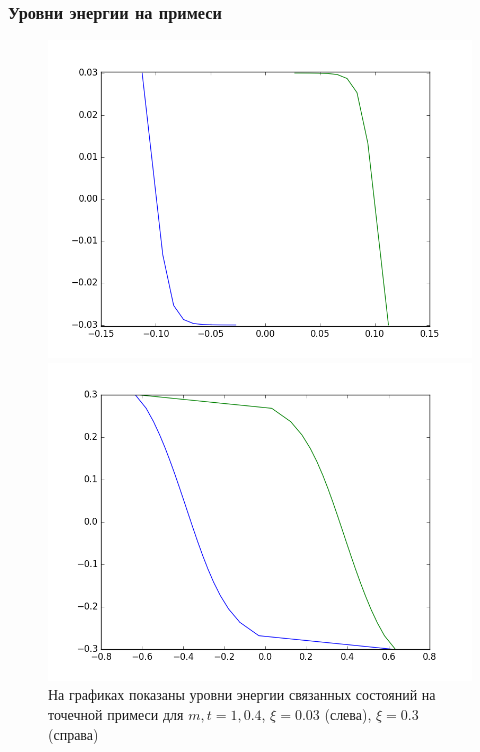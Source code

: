 \documentclass{beamer}
\begin{document}
\begin{frame}
    \frametitle{Уровни энергии на примеси}
    \begin{figure}[h]
        \centering
        \begin{minipage}[t]{0.45\linewidth}
            \includegraphics[width=0.99\linewidth]{impurity_levels.png}
        \end{minipage}
        \hfill
        \begin{minipage}[t]{0.45\linewidth}
            \includegraphics[width=0.99\linewidth]{gf_03-1-04.png}
        \end{minipage}
            \caption{
                    На графиках показаны уровни энергии связанных состояний на точечной примеси
                    для $m,t = 1,0.4$, $\xi = 0.03$ (слева), $\xi = 0.3$ (справа)
                    }
        \label{fig:impurity_numeric_levels}
    \end{figure}
\end{frame}
\end{document}
